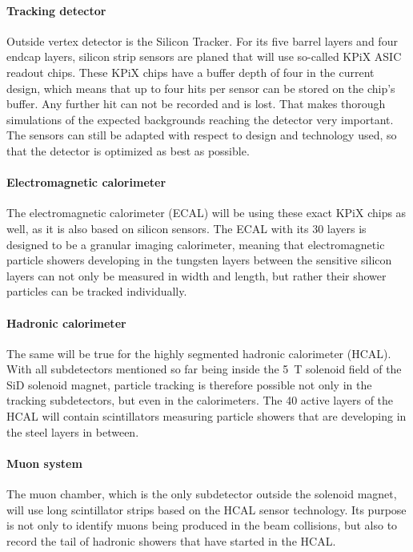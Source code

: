 \paragraph{Tracking detector}
Outside vertex detector is the Silicon Tracker.
For its five barrel layers and four endcap layers, silicon strip sensors are planed that will use so-called KPiX ASIC readout chips.
These KPiX chips have a buffer depth of four in the current design, which means that up to four hits per sensor can be stored on the chip's buffer.
Any further hit can not be recorded and is lost.
That makes thorough simulations of the expected backgrounds reaching the detector very important.
The sensors can still be adapted with respect to design and technology used, so that the detector is optimized as best as possible.
\paragraph{Electromagnetic calorimeter}
The electromagnetic calorimeter (ECAL) will be using these exact KPiX chips as well, as it is also based on silicon sensors.
The ECAL with its 30 layers is designed to be a granular imaging calorimeter, meaning that electromagnetic particle showers developing in the tungsten layers between the sensitive silicon layers can not only be measured in width and length, but rather their shower particles can be tracked individually.
\paragraph{Hadronic calorimeter}
The same will be true for the highly segmented hadronic calorimeter (HCAL).
With all subdetectors mentioned so far being inside the \SI{5}{\tesla} solenoid field of the SiD solenoid magnet, particle tracking is therefore possible not only in the tracking subdetectors, but even in the calorimeters.
The 40 active layers of the HCAL will contain scintillators measuring particle showers that are developing in the steel layers in between.
\paragraph{Muon system}
The muon chamber, which is the only subdetector outside the solenoid magnet, will use long scintillator strips based on the HCAL sensor technology.
Its purpose is not only to identify muons being produced in the beam collisions, but also to record the tail of hadronic showers that have started in the HCAL.
